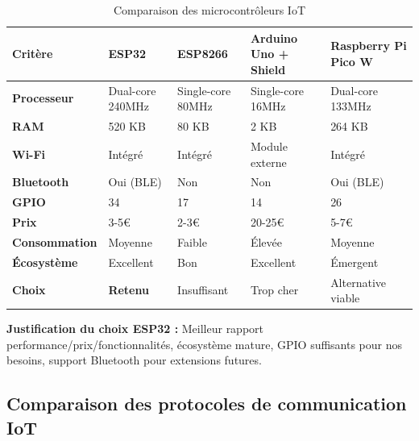 \begin{table}[htbp]
\centering
\small
\caption{Comparaison des microcontrôleurs IoT}
\label{tab:mcu_comparison}
\begin{tabular}{|p{2.5cm}|p{2.5cm}|p{2.5cm}|p{2.5cm}|p{2.5cm}|}
\hline
\rowcolor{sewesblu!20}
\textbf{Critère} & \textbf{ESP32} & \textbf{ESP8266} & \textbf{Arduino Uno + Shield} & \textbf{Raspberry Pi Pico W} \\
\hline
\textbf{Processeur} & Dual-core 240MHz & Single-core 80MHz & Single-core 16MHz & Dual-core 133MHz \\
\hline
\textbf{RAM} & 520 KB & 80 KB & 2 KB & 264 KB \\
\hline
\textbf{Wi-Fi} & Intégré & Intégré & Module externe & Intégré \\
\hline
\textbf{Bluetooth} & Oui (BLE) & Non & Non & Oui (BLE) \\
\hline
\textbf{GPIO} & 34 & 17 & 14 & 26 \\
\hline
\textbf{Prix} & 3-5€ & 2-3€ & 20-25€ & 5-7€ \\
\hline
\textbf{Consommation} & Moyenne & Faible & Élevée & Moyenne \\
\hline
\textbf{Écosystème} & Excellent & Bon & Excellent & Émergent \\
\hline
\rowcolor{green!10}
\textbf{Choix} & \textbf{Retenu} & Insuffisant & Trop cher & Alternative viable \\
\hline
\end{tabular}
\end{table}

\textbf{Justification du choix ESP32 :} Meilleur rapport performance/prix/fonctionnalités, écosystème mature, GPIO suffisants pour nos besoins, support Bluetooth pour extensions futures.


\subsection{Comparaison des protocoles de communication IoT}

